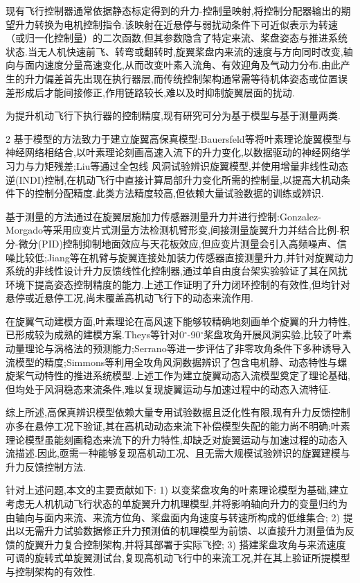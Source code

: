 \documentclass{aas}
\begin{document}
现有飞行控制器通常依据静态标定得到的升力-控制量映射,将控制分配器输出的期望升力转换为电机控制指令.该映射在近悬停与弱扰动条件下可近似表示为转速（或归一化控制量）的二次函数,但其参数隐含了特定来流、桨盘姿态与推进系统状态.当无人机快速前飞、转弯或翻转时,旋翼桨盘内来流的速度与方向同时改变,轴向与面内速度分量高速变化,从而改变叶素入流角、有效迎角及气动力分布.由此产生的升力偏差首先出现在执行器层,而传统控制架构通常需等待机体姿态或位置误差形成后才能间接修正,作用链路较长,难以及时抑制旋翼层面的扰动.

为提升机动飞行下执行器的控制精度,现有研究可分为基于模型与基于测量两类.
\par
\endgroup
\onecolumn\begin{multicols}{2}%
基于模型的方法致力于建立旋翼高保真模型:Bauersfeld等\cite{3}将叶素理论旋翼模型与神经网络相结合,以叶素理论刻画高速入流下的升力变化,以数据驱动的神经网络学习力与力矩残差;Liu等\cite{4}通过全包线
风洞试验辨识旋翼模型,并使用增量非线性动态逆(INDI)控制,在机动飞行中直接计算局部升力变化所需的控制量,以提高大机动条件下的控制分配精度.此类方法精度较高,但依赖大量试验数据的训练或辨识.

基于测量的方法通过在旋翼层施加力传感器测量升力并进行控制:Gonzalez-Morgado等\cite{5}采用应变片式测量方法检测机臂形变,间接测量旋翼升力并结合比例-积分-微分(PID)控制抑制地面效应与天花板效应,但应变片测量会引入高频噪声、信噪比较低;Jiang等\cite{6,7}在机臂与旋翼连接处加装力传感器直接测量升力,并针对旋翼动力系统的非线性设计升力反馈线性化控制器,通过单自由度台架实验验证了其在风扰环境下提高姿态控制精度的能力.上述工作证明了升力闭环控制的有效性,但均针对悬停或近悬停工况,尚未覆盖高机动飞行下的动态来流作用.

在旋翼气动建模方面,叶素理论在高风速下能够较精确地刻画单个旋翼的升力特性,已形成较为成熟的建模方案.Theys等\cite{8}针对0$^{\circ}$-90$^{\circ}$桨盘攻角开展风洞实验,比较了叶素动量理论与涡格法的预测能力;Serrano等\cite{9}进一步评估了非零攻角条件下多种诱导入流模型的精度;Simmons等\cite{10}利用全攻角风洞数据辨识了包含电机静、动态特性与螺旋桨气动特性的推进系统模型.上述工作为建立旋翼动态入流模型奠定了理论基础,但均处于风洞稳态来流条件,难以复现旋翼运动与加速过程中的动态入流特征.

综上所述,高保真辨识模型依赖大量专用试验数据且泛化性有限,现有升力反馈控制亦多在悬停工况下验证,其在高机动动态来流下补偿模型失配的能力尚不明确;叶素理论模型虽能刻画稳态来流下的升力特性,却缺乏对旋翼运动与加速过程的动态入流描述.因此,亟需一种能够复现高机动工况、且无需大规模试验辨识的旋翼建模与升力反馈控制方法.

针对上述问题,本文的主要贡献如下:
1) 以变桨盘攻角的叶素理论模型为基础,建立考虑无人机机动飞行状态的单旋翼升力机理模型,并将影响轴向升力的变量归约为由轴向与面内来流、来流方位角、桨盘面内角速度与转速所构成的低维集合;
2) 提出以\textcolor{mygreen}{无需升力试验数据修正升力预测值的机理模型}为前馈、以直接升力测量值为反馈的旋翼升力复合控制架构,并将其部署于实际飞控;
3) 搭建桨盘攻角与来流速度可调的旋转式单旋翼测试台,复现高机动飞行中的来流工况,并在其上验证所提模型与控制架构的有效性.


\end{multicols}
\end{document}
